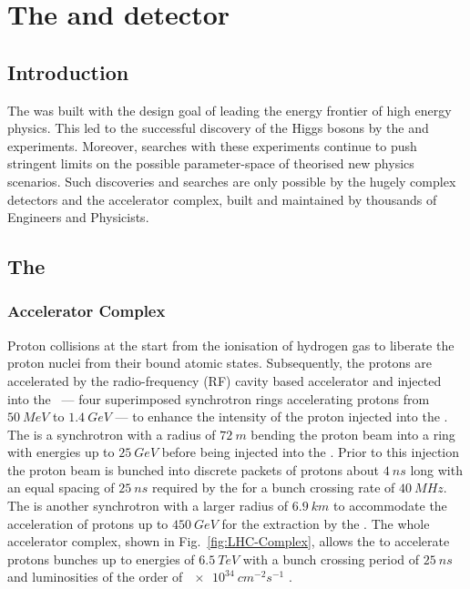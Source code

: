 \chapter{The \LHC and \CMS detector} \label{chap:detector}


\section{Introduction}

The \LHC was built with the design goal of leading the energy frontier of high
energy physics. This led to the successful discovery of the Higgs bosons by
the \ATLAS \cite{Aad:1471031} and \CMS \cite{Chatrchyan:1471016} experiments.
Moreover, \BSM searches with these experiments continue to push stringent
limits on the possible parameter-space of theorised new physics scenarios.
Such discoveries and searches are only possible by the hugely complex
detectors and the \LHC accelerator complex, built and maintained by thousands
of Engineers and Physicists.

\section{The \LHC}

\subsection{Accelerator Complex}

Proton collisions at the \LHC start from the ionisation of hydrogen gas to
liberate the proton nuclei from their bound atomic states. Subsequently, the
protons are accelerated by the radio-frequency (RF) cavity based accelerator
\LINACTWO and injected into the \PSBooster\ --- four superimposed synchrotron
rings accelerating protons from ${\SI{50}{MeV}}$ to ${\SI{1.4}{GeV}}$ --- to
enhance the intensity of the proton injected into the \PS. The \PS is a
synchrotron with a radius of ${\SI{72}{m}}$ bending the proton beam into a
ring with energies up to ${\SI{25}{GeV}}$ before being injected into the \SPS.
Prior to this injection the proton beam is bunched into discrete packets of
protons about ${\SI{4}{ns}}$ long with an equal spacing of ${\SI{25}{ns}}$
required by the \LHC for a bunch crossing rate of ${\SI{40}{MHz}}$. The \SPS
is another synchrotron with a larger radius of ${\SI{6.9}{km}}$ to accommodate
the acceleration of protons up to ${\SI{450}{GeV}}$ for the extraction by the
\LHC. The whole accelerator complex, shown in Fig.~\ref{fig:LHC-Complex},
allows the \LHC to accelerate protons bunches up to energies of
${\SI{6.5}{TeV}}$ with a bunch crossing period of ${\SI{25}{ns}}$ and
luminosities of the order of ${\SI{e34}{cm^{-2}s^{-1}}}$ \cite{Bruning:782076}.

